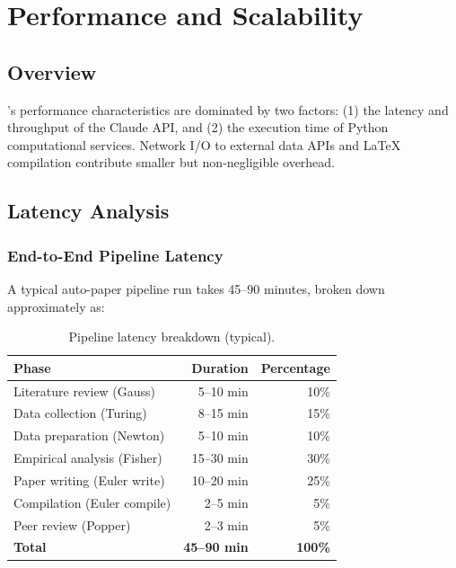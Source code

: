 \chapter{Performance and Scalability}
\label{ch:performance}

\section{Overview}
\label{sec:perf:overview}

\autoscholar's performance characteristics are dominated by two factors: (1) the latency and throughput of the Claude API, and (2) the execution time of Python computational services.
Network I/O to external data APIs and \LaTeX{} compilation contribute smaller but non-negligible overhead.

\section{Latency Analysis}
\label{sec:perf:latency}

\subsection{End-to-End Pipeline Latency}

A typical auto-paper pipeline run takes 45--90 minutes, broken down approximately as:

\begin{table}[H]
\centering
\caption{Pipeline latency breakdown (typical).}
\label{tab:latency-breakdown}
\begin{tabular}{lrr}
\toprule
\textbf{Phase} & \textbf{Duration} & \textbf{Percentage} \\
\midrule
Literature review (Gauss) & 5--10 min & 10\% \\
Data collection (Turing) & 8--15 min & 15\% \\
Data preparation (Newton) & 5--10 min & 10\% \\
Empirical analysis (Fisher) & 15--30 min & 30\% \\
Paper writing (Euler write) & 10--20 min & 25\% \\
Compilation (Euler compile) & 2--5 min & 5\% \\
Peer review (Popper) & 2--3 min & 5\% \\
\midrule
\textbf{Total} & \textbf{45--90 min} & \textbf{100\%} \\
\bottomrule
\end{tabular}
\end{table}

